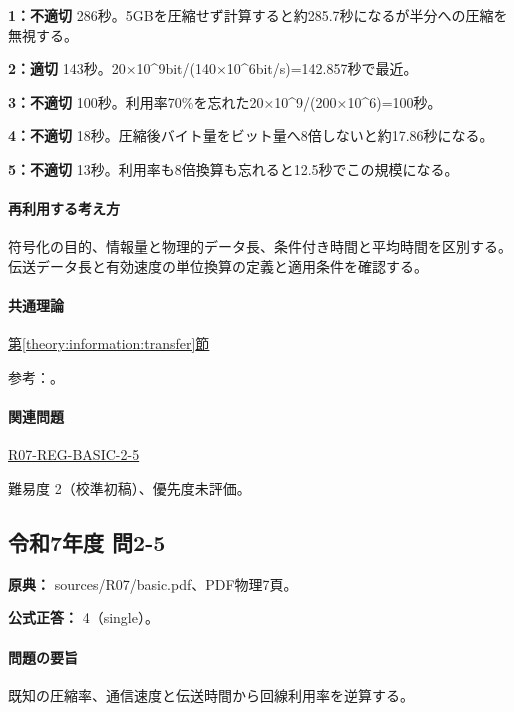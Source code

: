 \noindent\textbf{1：不適切} 286秒。5GBを圧縮せず計算すると約285.7秒になるが半分への圧縮を無視する。\par

\noindent\textbf{2：適切} 143秒。20×10\textasciicircum{}9bit/(140×10\textasciicircum{}6bit/s)=\allowbreak{}142.857秒で最近。\par

\noindent\textbf{3：不適切} 100秒。利用率70\%を忘れた20×10\textasciicircum{}9/(200×10\textasciicircum{}6)=\allowbreak{}100秒。\par

\noindent\textbf{4：不適切} 18秒。圧縮後バイト量をビット量へ8倍しないと約17.86秒になる。\par

\noindent\textbf{5：不適切} 13秒。利用率も8倍換算も忘れると12.5秒でこの規模になる。\par

\paragraph{再利用する考え方} 符号化の目的、情報量と物理的データ長、条件付き時間と平均時間を区別する。伝送データ長と有効速度の単位換算の定義と適用条件を確認する。

\paragraph{共通理論} \hyperref[theory:information:transfer]{第\ref*{theory:information:transfer}節}

\par 参考：\cite{info_deflate}。

\paragraph{関連問題} \hyperref[q:r07-reg-basic-2-5]{R07-REG-BASIC-2-5}

\par 難易度 2（校準初稿）、優先度未評価。

\subsection{令和7年度 問2-5}
\label{q:r07-reg-basic-2-5}

\noindent\textbf{原典：} sources/R07/basic.pdf、PDF物理7頁。

\textbf{公式正答：} 4（single）。

\paragraph{問題の要旨} 既知の圧縮率、通信速度と伝送時間から回線利用率を逆算する。

